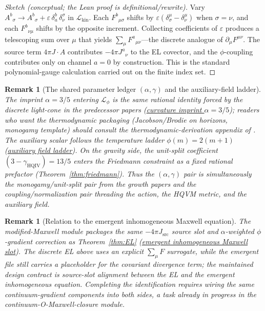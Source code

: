 \documentclass[11pt]{amsart}
\newtheorem{remark}[theorem]{Remark}
\begin{document}
\begin{proof}[Sketch (conceptual; the Lean proof is definitional/rewrite)]
Vary \(A^b{}_\sigma\to A^b{}_\sigma+\varepsilon\,\delta^b_a\,\delta^\sigma_\nu\) in \(\mathcal{L}_{\mathrm{kin}}\). Each \(F^b{}_{\mu\sigma}\) shifts by \(\varepsilon(\delta^\mu_\sigma-\delta^\mu_\nu)\) when \(\sigma=\nu\), and each \(F^b{}_{\nu\mu}\) shifts by the opposite increment. Collecting coefficients of \(\varepsilon\) produces a telescoping sum over \(\mu\) that yields \(\sum_\mu F^a{}_{\mu\nu}\)---the discrete analogue of \(\partial_\mu F^{\mu\nu}\). The source term \(4\pi J\!\cdot\!A\) contributes \(-4\pi J^a{}_\nu\) to the EL covector, and the \(\phi\)-coupling contributes only on channel \(a=0\) by construction. This is the standard polynomial-gauge calculation carried out on the finite index set.
\end{proof}

\begin{remark}[The shared parameter ledger \((\alpha,\gamma)\) and the auxiliary-field ladder]
The imprint \(\alpha=3/5\) entering \(\mathcal{L}_\phi\) is the \emph{same} rational identity forced by the discrete light-cone in the predecessor papers (\hyperref[lean:imprint-alpha]{curvature imprint \(\alpha=3/5\)}); readers who want the thermodynamic packaging (Jacobson/Brodie on horizons, monogamy template) should consult the thermodynamic-derivation appendix of \cite{hqiv-3d-growth-paper}. The auxiliary scalar follows the temperature ladder \(\phi(m)=2(m+1)\) (\hyperref[lean:phi-ladder]{auxiliary field ladder}). On the gravity side, the unit-split coefficient \((3-\gamma_{\mathrm{HQIV}})=13/5\) enters the Friedmann constraint as a fixed rational prefactor (Theorem~\ref{thm:friedmann}). Thus the \((\alpha,\gamma)\) pair is simultaneously the monogamy/unit-split pair from the growth papers and the coupling/normalization pair threading the action, the HQVM metric, and the auxiliary field.
\end{remark}

\begin{remark}[Relation to the emergent inhomogeneous Maxwell equation]
\label{rem:modified-maxwell}
The modified-Maxwell module packages the same \(-4\pi J_{\mathrm{src}}\) source slot and \(\alpha\)-weighted \(\phi\)-gradient correction as Theorem~\ref{thm:EL} (\hyperref[lean:emergent-maxwell]{emergent inhomogeneous Maxwell slot}). The discrete EL above uses an explicit \(\sum_\mu F\) surrogate, while the emergent file still carries a placeholder for the covariant divergence term; the maintained design contract is \emph{source-slot alignment} between the EL and the emergent inhomogeneous equation. Completing the identification requires wiring the same continuum-gradient components into both sides, a task already in progress in the continuum-O-Maxwell-closure module.
\end{remark}
\end{document}
